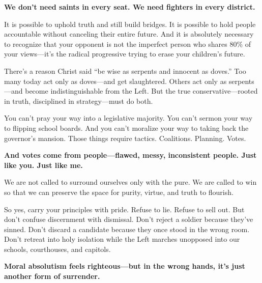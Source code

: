 \textbf{We don’t need saints in every seat. We need fighters in every district.}

It is possible to uphold truth and still build bridges. It is possible to hold people accountable without canceling their entire future. And it is absolutely necessary to recognize that your opponent is not the imperfect person who shares 80\% of your views—it’s the radical progressive trying to erase your children’s future.

There’s a reason Christ said “be wise as serpents and innocent as doves.” Too many today act only as doves—and get slaughtered. Others act only as serpents—and become indistinguishable from the Left. But the true conservative—rooted in truth, disciplined in strategy—must do both. 

You can’t pray your way into a legislative majority. You can’t sermon your way to flipping school boards. And you can’t moralize your way to taking back the governor’s mansion. Those things require tactics. Coalitions. Planning. Votes.

\textbf{And votes come from people—flawed, messy, inconsistent people. Just like you. Just like me.}

We are not called to surround ourselves only with the pure. We are called to win so that we can preserve the space for purity, virtue, and truth to flourish.

So yes, carry your principles with pride. Refuse to lie. Refuse to sell out. But don’t confuse discernment with dismissal. Don’t reject a soldier because they’ve sinned. Don’t discard a candidate because they once stood in the wrong room. Don’t retreat into holy isolation while the Left marches unopposed into our schools, courthouses, and capitols.

\textbf{Moral absolutism feels righteous—but in the wrong hands, it’s just another form of surrender.}